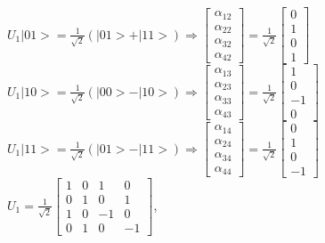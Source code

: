 \documentclass{article}
\begin{document}
$U_1|01> = \frac{1}{\sqrt{2}}(|01> + |11>) \Rightarrow \begin{bmatrix}
    \alpha_{12}\\
    \alpha_{22}\\
    \alpha_{32}\\
    \alpha_{42}
\end{bmatrix} = \frac{1}{\sqrt{2}}\begin{bmatrix}
    0\\
    1\\
    0\\
    1
\end{bmatrix}$
\newline\hspace*{0.4cm}
$U_1|10> = \frac{1}{\sqrt{2}}(|00> - |10>) \Rightarrow \begin{bmatrix}
    \alpha_{13}\\
    \alpha_{23}\\
    \alpha_{33}\\
    \alpha_{43}
\end{bmatrix} = \frac{1}{\sqrt{2}}\begin{bmatrix}
    1\\
    0\\
    -1\\
    0
\end{bmatrix}$
\newline\hspace*{0.4cm}
$U_1|11> = \frac{1}{\sqrt{2}}(|01> - |11>) \Rightarrow \begin{bmatrix}
    \alpha_{14}\\
    \alpha_{24}\\
    \alpha_{34}\\
    \alpha_{44}
\end{bmatrix} = \frac{1}{\sqrt{2}}\begin{bmatrix}
    0\\
    1\\
    0\\
    -1
\end{bmatrix}$
\newline\hspace*{0.4cm}
$U_1 = \frac{1}{\sqrt{2}}\begin{bmatrix}
    1 & 0 & 1 & 0\\
    0 & 1 & 0 & 1 \\
    1 & 0 & -1 & 0\\
    0 & 1 & 0 & -1
\end{bmatrix}$, \hspace*{0.3cm}
\end{document}
